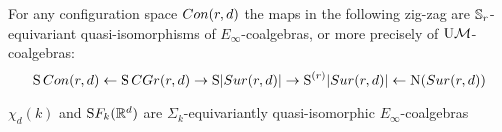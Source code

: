 %



\begin{theorem*}
	For any configuration space $Con(r,d)$ the maps in the following zig-zag are $\mathbb{S}_r$-equivariant quasi-isomorphisms of $E_\infty$-coalgebras, or more precisely of $\mathrm{U}\mathcal{M}$-coalgebras:
	\[
	\operatorname{S}Con(r,d) \leftarrow \operatorname{S} CGr(r,d) \to \operatorname{S}\lvert Sur(r,d)\rvert \to \operatorname{S}^{(r)}\lvert Sur(r,d)\rvert \leftarrow \operatorname{N}(Sur(r,d))
	\]

\end{theorem*}

\begin{proposition} \label{sur-model}
	$\chi_d(k)$ and $\mathrm{S}{F_k(\mathbb{R}^d)}$ are $\Sigma_k$-equivariantly quasi-isomorphic $E_\infty$-coalgebras
\end{proposition}

